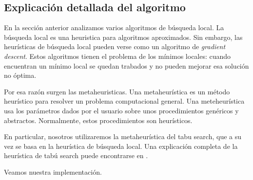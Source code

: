 
\subsection{Explicación detallada del algoritmo}

En la sección anterior analizamos varios algoritmos de búsqueda local.
La búsqueda local es una heuristica para algoritmos aproximados.
Sin embargo, las heurísticas de búsqueda local pueden verse como un algoritmo de \emph{gradient descent}.
Estos algoritmos tienen el problema de los mínimos locales: cuando encuentran un mínimo local se quedan trabados y no pueden mejorar esa solución no óptima. 

Por esa razón surgen las metaheuristicas.
Una metaheurística es un método heurístico para resolver un  problema computacional general.
Una meteheurística usa los parámetros dados por el usuario sobre unos procedimientos genéricos y abstractos. 
Normalmente, estos procedimientos son heurísticos.

En particular, nosotros utilizaremos la metaheurística del tabu search, que a su vez se basa en la heurística de búsqueda local.
Una explicación completa de la heurística de tabú search puede encontrarse en \cite{tabusearch}.

Veamos nuestra implementación.


